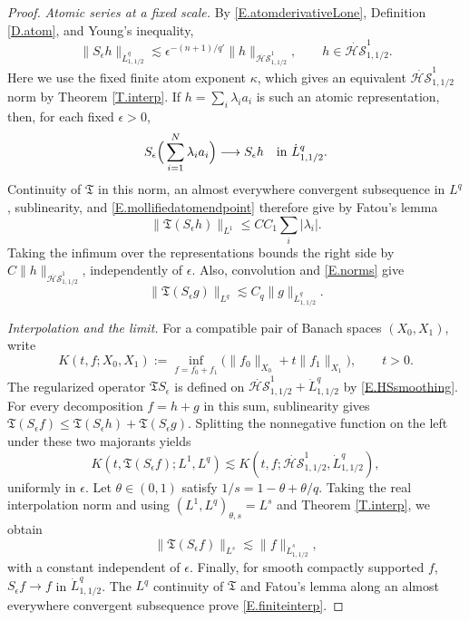 \documentclass[12pt,leqno]{amsart}
\numberwithin{equation}{section}
\newcommand{\HS}{\dot{\mathcal{HS}}^{1}_{1,1/2}}
\theoremstyle{plain}
\theoremstyle{remark}
\begin{document}
\begin{proof}
\noindent\emph{Atomic series at a fixed scale.} By \eqref{E.atomderivativeLone},
Definition \ref{D.atom}, and Young's inequality,
\begin{equation}\label{E.HSsmoothing}
 \|S_\epsilon h\|_{\dot L^q_{1,1/2}}
 \lesssim\epsilon^{-(n+1)/q'}\|h\|_{\HS},\qquad h\in\HS.
\end{equation}
Here we use the fixed finite atom exponent $\kappa$, which gives an
equivalent $\HS$ norm by Theorem \ref{T.interp}. If
$h=\sum_i\lambda_i a_i$ is such an atomic representation, then, for each
fixed $\epsilon>0$,
\[
 S_\epsilon\Big(\sum_{i=1}^N\lambda_i a_i\Big)
 \longrightarrow S_\epsilon h\quad\hbox{in }\dot L^q_{1,1/2}.
\]
Continuity of $\mathfrak T$ in this norm, an almost everywhere convergent
subsequence in $L^q$, sublinearity, and \eqref{E.mollifiedatomendpoint}
therefore give by Fatou's lemma
\begin{equation}\label{E.regularizedendpoint}
 \|\mathfrak T(S_\epsilon h)\|_{L^1}
 \le C C_1\sum_i|\lambda_i|.
\end{equation}
Taking the infimum over the representations bounds the right side by
$C\|h\|_{\HS}$, independently of $\epsilon$.
Also, convolution and \eqref{E.norms} give
\[
 \|\mathfrak T(S_\epsilon g)\|_{L^q}
 \lesssim C_q\|g\|_{\dot L^q_{1,1/2}}.
\]
\medskip

\noindent\emph{Interpolation and the limit.} For a compatible pair of Banach spaces
$(X_0,X_1)$, write
\[
 K(t,f;X_0,X_1):=\inf_{f=f_0+f_1}
       \big(\|f_0\|_{X_0}+t\|f_1\|_{X_1}\big),\qquad t>0.
\]
The regularized operator $\mathfrak T S_\epsilon$ is defined on
$\HS+\dot L^q_{1,1/2}$ by \eqref{E.HSsmoothing}. For every decomposition
$f=h+g$ in this sum, sublinearity gives
$\mathfrak T(S_\epsilon f)\le\mathfrak T(S_\epsilon h)+
\mathfrak T(S_\epsilon g)$. Splitting the nonnegative function on the left
under these two majorants yields
\[
 K(t,\mathfrak T(S_\epsilon f);L^1,L^q)
 \lesssim K(t,f;\HS,\dot L^q_{1,1/2}),
\]
uniformly in $\epsilon$. Let $\theta\in(0,1)$ satisfy
$1/s=1-\theta+\theta/q$. Taking the real interpolation norm and using
$(L^1,L^q)_{\theta,s}=L^s$ and Theorem \ref{T.interp}, we obtain
\[
 \|\mathfrak T(S_\epsilon f)\|_{L^s}
 \lesssim\|f\|_{\dot L^s_{1,1/2}},
\]
with a constant independent of $\epsilon$. Finally, for smooth compactly
supported $f$, $S_\epsilon f\to f$ in $\dot L^q_{1,1/2}$. The $L^q$
continuity of $\mathfrak T$ and Fatou's lemma along an almost everywhere
convergent subsequence prove \eqref{E.finiteinterp}.
\end{proof}
\end{document}
